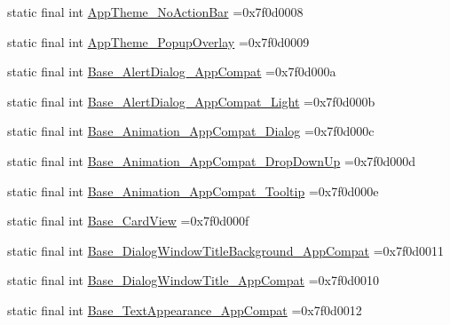 \begin{DoxyCompactItemize}
static final int \mbox{\hyperlink{classbr_1_1unb_1_1cic_1_1mp_1_1marketmaster_1_1R_1_1style_a3e6fc562d1ca73b4dac6dea2a63e4d39}{App\+Theme\+\_\+\+No\+Action\+Bar}} =0x7f0d0008
\item 
static final int \mbox{\hyperlink{classbr_1_1unb_1_1cic_1_1mp_1_1marketmaster_1_1R_1_1style_ae420f9aec00ed5c4ff2e0c8678e68111}{App\+Theme\+\_\+\+Popup\+Overlay}} =0x7f0d0009
\item 
static final int \mbox{\hyperlink{classbr_1_1unb_1_1cic_1_1mp_1_1marketmaster_1_1R_1_1style_a5ce543789b5c24bc3997a7f9914b8ccb}{Base\+\_\+\+Alert\+Dialog\+\_\+\+App\+Compat}} =0x7f0d000a
\item 
static final int \mbox{\hyperlink{classbr_1_1unb_1_1cic_1_1mp_1_1marketmaster_1_1R_1_1style_a116df81c34026d88b8f35801aa426017}{Base\+\_\+\+Alert\+Dialog\+\_\+\+App\+Compat\+\_\+\+Light}} =0x7f0d000b
\item 
static final int \mbox{\hyperlink{classbr_1_1unb_1_1cic_1_1mp_1_1marketmaster_1_1R_1_1style_a16308082307a15a0963084ec248221b5}{Base\+\_\+\+Animation\+\_\+\+App\+Compat\+\_\+\+Dialog}} =0x7f0d000c
\item 
static final int \mbox{\hyperlink{classbr_1_1unb_1_1cic_1_1mp_1_1marketmaster_1_1R_1_1style_a93a05eb3df897f86f7861e775ded390f}{Base\+\_\+\+Animation\+\_\+\+App\+Compat\+\_\+\+Drop\+Down\+Up}} =0x7f0d000d
\item 
static final int \mbox{\hyperlink{classbr_1_1unb_1_1cic_1_1mp_1_1marketmaster_1_1R_1_1style_a3089d29aecd861e787d6dcdc103fb914}{Base\+\_\+\+Animation\+\_\+\+App\+Compat\+\_\+\+Tooltip}} =0x7f0d000e
\item 
static final int \mbox{\hyperlink{classbr_1_1unb_1_1cic_1_1mp_1_1marketmaster_1_1R_1_1style_ac8cd3d5611a0aaee8434bbb05c5cebf9}{Base\+\_\+\+Card\+View}} =0x7f0d000f
\item 
static final int \mbox{\hyperlink{classbr_1_1unb_1_1cic_1_1mp_1_1marketmaster_1_1R_1_1style_aec3904dfc839aa321c9c70cf09849f99}{Base\+\_\+\+Dialog\+Window\+Title\+Background\+\_\+\+App\+Compat}} =0x7f0d0011
\item 
static final int \mbox{\hyperlink{classbr_1_1unb_1_1cic_1_1mp_1_1marketmaster_1_1R_1_1style_a657547a3469bb0a244261ca4eac4c194}{Base\+\_\+\+Dialog\+Window\+Title\+\_\+\+App\+Compat}} =0x7f0d0010
\item 
static final int \mbox{\hyperlink{classbr_1_1unb_1_1cic_1_1mp_1_1marketmaster_1_1R_1_1style_a46f117a649a380ddccfa6d6906e8464d}{Base\+\_\+\+Text\+Appearance\+\_\+\+App\+Compat}} =0x7f0d0012
\item 

\end{DoxyCompactItemize}

